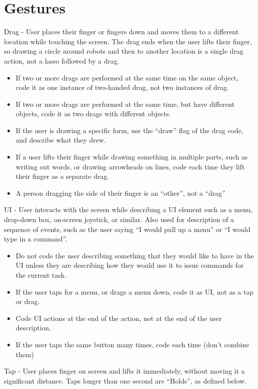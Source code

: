 \section{Gestures} \label{section:Gestures}

Drag - User places their finger or fingers down and moves them to a different location while touching the screen. The drag ends when the user lifts their finger, so drawing a circle around robots and then to another location is a single drag action, not a lasso followed by a drag. 
\begin{itemize}
	\item If two or more drags are performed at the same time on the same object, code it as one instance of two-handed drag, not two instances of drag. 
	\item If two or more drags are performed at the same time, but have different objects, code it as two drags with different objects.
	\item If the user is drawing a specific form, use the ``draw'' flag of the drag code, and describe what they drew. 
	\item If a user lifts their finger while drawing something in multiple parts, such as writing out words, or drawing arrowheads on lines, code each time they lift their finger as a separate drag. 
	\item A person dragging the side of their finger is an ``other'', not a ``drag''
\end{itemize}

UI - User interacts with the screen while describing a UI element such as a menu, drop-down box, on-screen joystick, or similar. Also used for description of a sequence of events, such as the user saying ``I would pull up a menu'' or ``I would type in a command''. 
\begin{itemize}
	\item Do not code the user describing something that they would like to have in the UI unless they are describing how they would use it to issue commands for the current task. 
	\item If the user taps for a menu, or drags a menu down, code it as UI, not as a tap or drag. \item Code UI actions at the end of the action, not at the end of the user description. 
	\item If the user taps the same button many times, code each time (don't combine them)
\end{itemize}
 
Tap - User places finger on screen and lifts it immediately, without moving it a significant distance. Taps longer than one second are ``Holds'', as defined below. 
 
